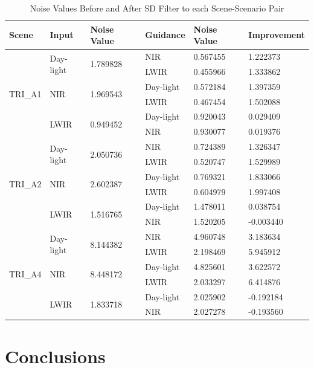 \documentclass[10pt,twocolumn,letterpaper]{article}
\begin{document}
	\bgroup
	\def\arraystretch{1.25}\setlength{\tabcolsep}{1.7em}
	\begin{table}[]
		\centering
				\caption{Noise Values Before and After SD Filter to each Scene-Scenario Pair}
		\label{tableNoiseLevelImprovements}
		\begin{tabular}{llllll}
			\hline
			Scene                    & Input                      & Noise Value               & Guidance  & Noise Value & Improvement \\ \hline
			\multirow{6}{*}{TRI\_A1} & \multirow{2}{*}{Day-light} & \multirow{2}{*}{1.789828} & NIR       & 0.567455 & 1.222373    \\
			&                            &                           & LWIR      & 0.455966 & 1.333862    \\ \cline{2-6} 
			& \multirow{2}{*}{NIR}       & \multirow{2}{*}{1.969543} & Day-light & 0.572184 & 1.397359    \\
			&                            &                           & LWIR      & 0.467454 & 1.502088    \\ \cline{2-6} 
			& \multirow{2}{*}{LWIR}      & \multirow{2}{*}{0.949452} & Day-light & 0.920043 & 0.029409    \\
			&                            &                           & NIR       & 0.930077 & 0.019376    \\ \hline
			\multirow{6}{*}{TRI\_A2} & \multirow{2}{*}{Day-light} & \multirow{2}{*}{2.050736} & NIR       & 0.724389 & 1.326347    \\
			&                            &                           & LWIR      & 0.520747 & 1.529989    \\ \cline{2-6} 
			& \multirow{2}{*}{NIR}       & \multirow{2}{*}{2.602387} & Day-light & 0.769321 & 1.833066    \\
			&                            &                           & LWIR      & 0.604979 & 1.997408    \\ \cline{2-6} 
			& \multirow{2}{*}{LWIR}      & \multirow{2}{*}{1.516765} & Day-light & 1.478011 & 0.038754    \\
			&                            &                           & NIR       & 1.520205 & -0.003440   \\ \hline
			\multirow{6}{*}{TRI\_A4} & \multirow{2}{*}{Day-light} & \multirow{2}{*}{8.144382} & NIR       & 4.960748 & 3.183634    \\
			&                            &                           & LWIR      & 2.198469 & 5.945912    \\ \cline{2-6} 
			& \multirow{2}{*}{NIR}       & \multirow{2}{*}{8.448172} & Day-light & 4.825601 & 3.622572    \\
			&                            &                           & LWIR      & 2.033297 & 6.414876    \\ \cline{2-6} 
			& \multirow{2}{*}{LWIR}      & \multirow{2}{*}{1.833718} & Day-light & 2.025902 & -0.192184   \\
			&                            &                           & NIR       & 2.027278 & -0.193560   \\ \hline
		\end{tabular}

	\end{table}
	\egroup
\section{Conclusions}	

	{\small
		
		
	}
	
\end{document}
